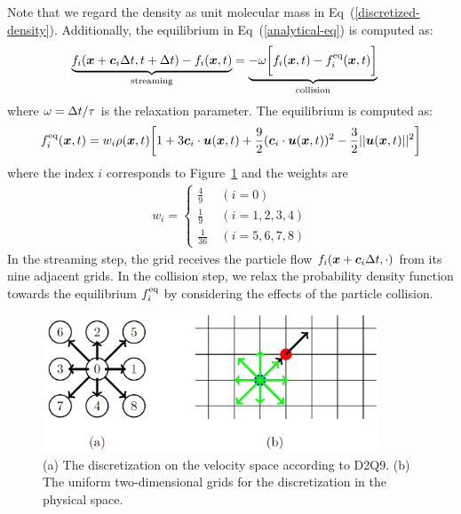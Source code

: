 Note that we regard the density as
unit molecular mass in Eq~(\ref{discretized-density}).
Additionally, the equilibrium in Eq~(\ref{analytical-eq}) is computed as:
\begin{equation}
\begin{aligned}
  \underbrace{f_i(\boldsymbol{x} + \boldsymbol{c}_i\Delta t , t + \Delta t) - f_i(\boldsymbol{x}, t)}_{
    \text{streaming}
  } &= 
  \underbrace{- \omega 
  \biggl[
    f_i(\boldsymbol{x}, t) -
    f^{\rm eq}_i(\boldsymbol{x}, t)
  \biggl]}_{
    \text{collision}
  }
\end{aligned}
\label{discretized-streaming}
\end{equation}
where $\omega = \Delta t / \tau$ is the relaxation parameter.
The equilibrium is computed as\cite{zhao2002non}:
\begin{equation}
\begin{aligned}
  f^{\rm eq}_i(\boldsymbol{x}, t) &=
  w_i \rho(\boldsymbol{x}, t) \biggl[
    1 + 3 \boldsymbol{c}_i \cdot \boldsymbol{u}(\boldsymbol{x}, t) +
    \frac{9}{2}(\boldsymbol{c}_i \cdot \boldsymbol{u}(\boldsymbol{x}, t))^2
    -\frac{3}{2} || \boldsymbol{u}(\boldsymbol{x}, t) ||^2
  \biggr] \\
\end{aligned}
\label{discretized-eq}
\end{equation}
where the index $i$ corresponds to Figure~\ref{fig:d2q9}
and the weights are 
\begin{eqnarray}
  w_i = \left\{
  \begin{array}{cl}
     \frac{4}{9}&~(i = 0) \\
     \frac{1}{9}&~(i=1,2,3,4) \\
     \frac{1}{36}&~(i=5,6,7,8)
  \end{array}
  \right.
\end{eqnarray}
In the streaming step, the grid receives 
the particle flow $f_i(\boldsymbol{x} + \boldsymbol{c}_i \Delta t, \cdot)$
from its nine adjacent grids.
In the collision step,
we relax the probability density function 
towards the equilibrium $f_i^{\rm eq}$
by considering the effects of the particle collision.

\begin{figure}[h!]
  \begin{center}
   \includegraphics[width=10cm]{logos/Gitter_LBM.png}
   \caption{
      (a) The discretization on the velocity space according to D2Q9.
      (b) The uniform two-dimensional grids for
      the discretization in the physical space.
   }
  \label{fig:d2q9}
  \end{center}
\end{figure}


